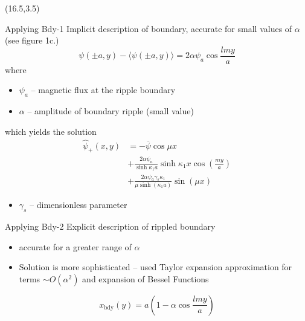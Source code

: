 \documentclass{beamer}
\begin{document}
\begin{frame}[t]
\break

\begin{textblock}{15}(16.5,3.5)
\begin{block}{Applying Bdy-1}
    Implicit description of boundary, accurate for small values of $\alpha$ \cite{dewar2017} (see figure 1c.)
\begin{equation}
    \label{eq:bdy1}
    \psi\left( \pm a, y \right) - \langle \psi\left( \pm a, y \right) \rangle = 2\alpha \psi_a \cos{\frac{lmy}{a}}
\end{equation} 
where
\begin{itemize}
    \item $\psi_a$ -- magnetic flux at the ripple boundary
    \item $\alpha$ -- amplitude of boundary ripple (small value)
\end{itemize}
\newline
which yields the solution
\begin{equation}
\begin{split}
    \hat{\psi}_+ (x,y) & = -\overline{\psi}\cos{\mu x} \\
                       & + \frac{2\alpha \psi_a}{\sinh{\kappa_1 a}} \sinh{\kappa_1 x} \cos\left( \frac{my}{a} \right) \\
                       & + \frac{2\alpha \psi_a \gamma_s \kappa_1}{\mu \sinh\left( \kappa_1 a \right) } \sin\left( \mu x \right) 
\end{split}
\end{equation}
\begin{itemize}
    \item $\gamma_s$ -- dimensionless parameter
\end{itemize}
\end{block}

\begin{block}{Applying Bdy-2}
    Explicit description of rippled boundary \cite{dewar2017}
\begin{itemize}
    \item accurate for a greater range of $\alpha$ 
    \item Solution is more sophisticated -- used Taylor expansion approximation for terms $\sim O(\alpha^2)$ and expansion of Bessel Functions
\end{itemize}
\begin{equation}
    \label{eq:bdy2}
    x_{\text{bdy}}\left( y \right) =a\left( 1-\alpha\cos{\frac{lmy}{a}} \right) 
\end{equation} 
\end{block}


\end{textblock}
\end{frame}
\end{document}
